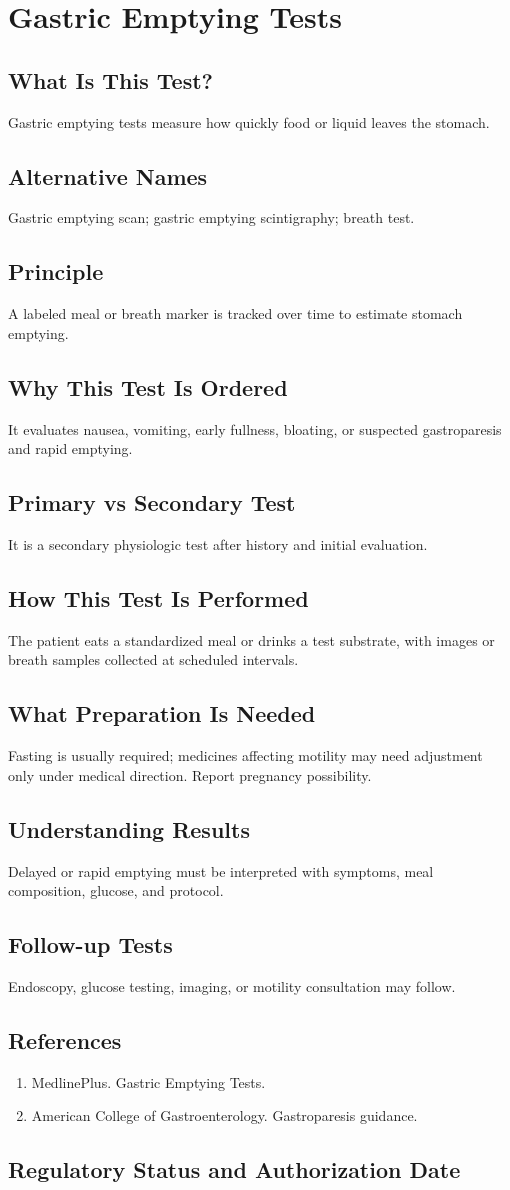 \chapter{Gastric Emptying Tests}
\section*{What Is This Test?} Gastric emptying tests measure how quickly food or liquid leaves the stomach.\section*{Alternative Names} Gastric emptying scan; gastric emptying scintigraphy; breath test.\section*{Principle} A labeled meal or breath marker is tracked over time to estimate stomach emptying.\section*{Why This Test Is Ordered} It evaluates nausea, vomiting, early fullness, bloating, or suspected gastroparesis and rapid emptying.\section*{Primary vs Secondary Test} It is a secondary physiologic test after history and initial evaluation.\section*{How This Test Is Performed} The patient eats a standardized meal or drinks a test substrate, with images or breath samples collected at scheduled intervals.\section*{What Preparation Is Needed} Fasting is usually required; medicines affecting motility may need adjustment only under medical direction. Report pregnancy possibility.\section*{Understanding Results} Delayed or rapid emptying must be interpreted with symptoms, meal composition, glucose, and protocol.\section*{Follow-up Tests} Endoscopy, glucose testing, imaging, or motility consultation may follow.\section*{References} \begin{enumerate}\item MedlinePlus. Gastric Emptying Tests.\item American College of Gastroenterology. Gastroparesis guidance.\end{enumerate}\clearpage\section*{Regulatory Status and Authorization Date}\clearpage
